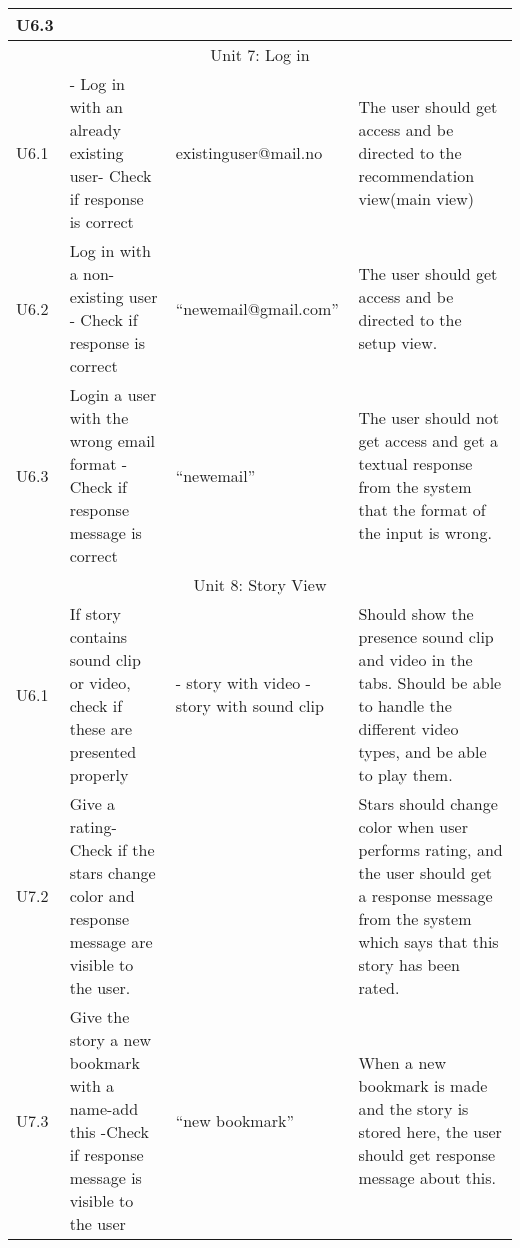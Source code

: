{\begin{center}
\begin{longtable}{ | p{1.5cm} | p{6.5cm} | p{3cm} | p{6.5cm} |}
			U6.3 &  & &  \\ \hline							
					
			\multicolumn{4}{c}{Unit 7: Log in}	\\\hline			
			
			U6.1 & - Log in with an already existing user\newline - Check if response is correct & existinguser@\newline mail.no & The user should get access and be directed to the recommendation view(main view)   \\ \hline			
			
			U6.2 & Log in with a non-existing user \newline - Check if response is correct & “newemail@\newline gmail.com” & The user should get access and be directed to the setup view. \\\hline	
								
			U6.3 &  Login a user with the wrong email format \newline - Check if response message is correct & “newemail” & The user should not get access and get a textual response from the system that the format of the input is wrong. \\ \hline						
			
			\multicolumn{4}{c}{Unit 8: Story View}	\\\hline		
			U6.1 & If story contains sound clip or video, check if these are presented properly & - story with video\newline
			-story with sound clip & Should show the presence sound clip and video in the tabs. Should be able to handle the different video types, and be able to play them.   \\ \hline			
			
			U7.2 & Give a rating\newline - Check if the stars change color and response message are visible to the user.  & & Stars should change color when user performs rating, and the user should get a response message from the system which says that this story has been rated.  \\\hline	
								
			U7.3 & Give the story a new bookmark with a name\newline -add this \newline -Check if response message is visible to the user  & “new bookmark”  & When a new bookmark is made and the story is stored here, the user should get response message about this. \\ \hline	
			

\end{longtable}
\end{center}}
